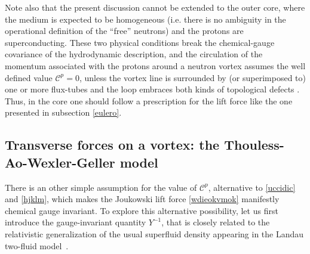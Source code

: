 \documentclass[preprints,article,accept,moreauthors,pdftex]{mdpi}
\begin{document}
Note also that the present discussion cannot be extended to the outer core, where the medium is expected to be homogeneous (i.e. there is no ambiguity in the operational definition of the ``free'' neutrons) and the protons are superconducting. These two physical conditions break the chemical-gauge covariance of the hydrodynamic description, and the circulation of the momentum associated with the protons around a neutron vortex assumes the well defined value $\mathcal{C}^p=0$, unless the vortex line is surrounded by (or superimposed to) one or more flux-tubes and the loop embraces both kinds of topological defects \cite{alpar_up_84,mendell1991,andersson_sidery_2006,sourie_corepinn_2020MNRAS}. 
Thus, in the core one should follow a prescription for the lift force like the one presented in subsection \ref{eulero}. 



\subsection{Transverse forces on a vortex: the Thouless-Ao-Wexler-Geller model}

There is an other simple assumption for the value of $\mathcal{C}^p$, alternative to \eqref{uccidic} and \eqref{hjklm}, which makes the Joukowski lift force \eqref{wdieokvmok} manifestly chemical gauge invariant. 
To explore  this alternative possibility, let us first introduce the gauge-invariant quantity $Y^{-1}$, that is closely  related to the relativistic generalization of the usual superfluid density appearing in the Landau two-fluid model~\cite{Gusakov2007,Termo}.
\end{document}
